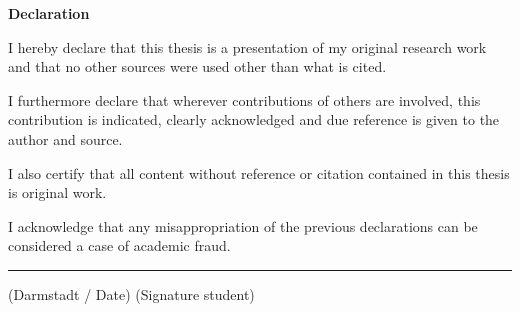 \newpage %

\newpage
\thispagestyle{empty} 
%

\textbf{\Large Declaration}
\par \vspace{5mm}
I hereby declare that this thesis is a presentation of my original research work and that no other sources were used other than what is cited.
\par
I furthermore declare that wherever contributions of others are involved, this contribution is indicated, clearly acknowledged and due reference is given to the author and source.
\par
I also certify that all content without reference or citation contained in this thesis is original work.
\par
I acknowledge that any misappropriation of the previous declarations can be considered a case of academic fraud.
\par
\vspace{25mm}
\rule[0ex]{\textwidth}{0.4pt}
(Darmstadt / Date)\hspace{30ex}	(Signature student)


\newpage %

